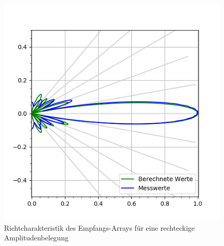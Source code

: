 \clearpage
\begin{figure}[htb]
\begin{minipage}{0.5\textwidth}
\includegraphics[width=\textwidth]{graphics/plot_test_characteristic_receiver_0_deg_send_rect_receive_rect_4_bursts.png}
\caption{Richtcharakteristik des Empfangs-Arrays für eine rechteckige Amplitudenbelegung} %
\label{fig:plot_test_characteristic_receiver_0_deg_send_rect_receive_rect_4_bursts}
%
\end{minipage}
\begin{minipage}{0.5\textwidth}

\end{minipage}
\end{figure}
